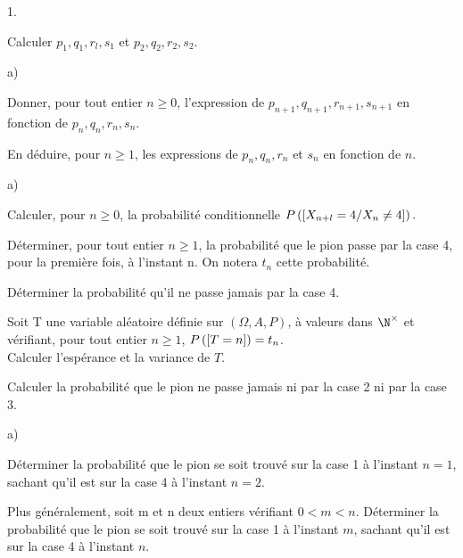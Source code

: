 \documentclass[11pt]{article}%
\begin{document}
\begin{noliste}{1.}
 \setlength{\itemsep}{4mm}
\item Calculer $p_{1},q_{1},r_{l},s_{1}$ et $p_{2},q_{2},r_{2},s_{2}.$

\item 

\begin{noliste}{a)}
 \setlength{\itemsep}{2mm}
\item Donner, pour tout entier $n\geq 0$, l'expression de $p_{n +
1},q_{n + 1},r_{n + 1},s_{n + 1}$ en fonction de
$p_{n},q_{n},r_{n},s_{n}.$

\item En déduire, pour $n\geq 1$, les expressions de
$p_{n},q_{n},r_{n}$
et $s_{n}$ en fonction de $n$.
\end{noliste}

\item 

\begin{noliste}{a)}
 \setlength{\itemsep}{2mm}
\item Calculer, pour $n\geq 0$, la probabilité conditionnelle
$P\left(\left[ {X_{n + l} = 4/X_{n}\neq 4} \right]\right).$

\item Déterminer, pour tout entier $n\geq 1$, la probabilité que le
pion passe par la case 4, pour la première fois, à l'instant n. On
notera $t_{n}$ cette probabilité.

\item Déterminer la probabilité qu'il ne passe jamais par la case 4.

\item Soit T une variable aléatoire définie sur $(\Omega,A,P)$, à
valeurs
dans $\N^{\times }$ et vérifiant, pour tout entier $n\geq 1$,
$P\left(\left[ {T = n} \right]\right) = t_{n}$. \\
Calculer l'espérance et la variance de $T$.
\end{noliste}

\item Calculer la probabilité que le pion ne passe jamais ni par la
case 2
ni par la case 3.

\item 

\begin{noliste}{a)}
 \setlength{\itemsep}{2mm}
\item Déterminer la probabilité que le pion se soit trouvé sur la case
1 à
l'instant $n = 1$, sachant qu'il est sur la case 4 à l'instant $n = 2$.

\item Plus généralement, soit m et n deux entiers vérifiant $0<m<n$.
Déterminer la probabilité que le pion se soit trouvé sur la case 1 à
l'instant 
$m$, sachant qu'il est sur la case 4 à l'instant $n$.
\end{noliste}
\end{noliste}

\label{fin}
\end{document}
